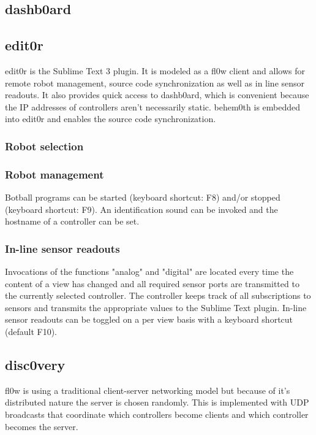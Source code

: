 \documentclass[conference]{IEEEtran}
\begin{document}
\subsection{dashb0ard}

\subsection{edit0r}
edit0r is the Sublime Text 3 plugin. It is modeled as a fl0w client and allows for remote robot management, source code synchronization as well as in line sensor readouts. It also provides quick access to dashb0ard, which is convenient because the IP addresses of controllers aren't necessarily static. behem0th\cite{behem0th:Christoph Heiss} is embedded into edit0r and enables the source code synchronization.  

\subsubsection{Robot selection}


\subsubsection{Robot management}
Botball programs can be started (keyboard shortcut: F8) and/or stopped (keyboard shortcut: F9). An identification sound can be invoked and the hostname of a controller can be set.

\subsubsection{In-line sensor readouts}
Invocations of the functions "analog" and "digital" are located every time the content of a view has changed and all required sensor ports are transmitted to the currently selected controller. The controller keeps track of all subscriptions to sensors and transmits the appropriate values to the Sublime Text\cite{Sublime Text 3:Sublime HQ} plugin.  
In-line sensor readouts can be toggled on a per view basis with a keyboard shortcut (default F10). 

\subsection{disc0very}
fl0w is using a traditional client-server networking model but because of it's distributed nature the server is chosen randomly. This is implemented with UDP broadcasts that coordinate which controllers become clients and which controller becomes the server. 
\end{document}
